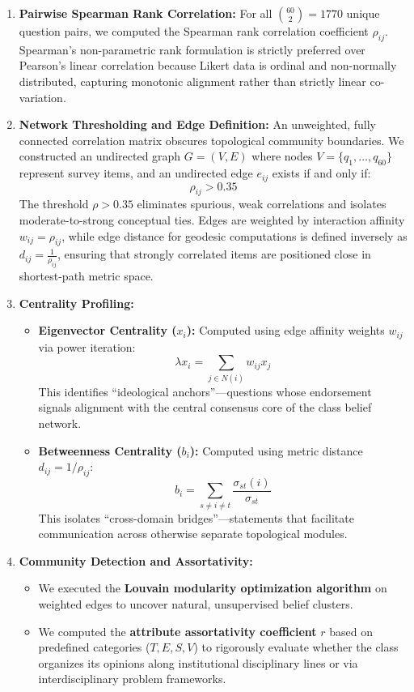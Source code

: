 \documentclass[11pt,a4paper]{article}
\begin{document}
\begin{enumerate}
    \item \textbf{Pairwise Spearman Rank Correlation:} For all $\binom{60}{2} = 1770$ unique question pairs, we computed the Spearman rank correlation coefficient $\rho_{ij}$. Spearman's non-parametric rank formulation is strictly preferred over Pearson's linear correlation because Likert data is ordinal and non-normally distributed, capturing monotonic alignment rather than strictly linear co-variation.
    
    \item \textbf{Network Thresholding and Edge Definition:} An unweighted, fully connected correlation matrix obscures topological community boundaries. We constructed an undirected graph $G = (V, E)$ where nodes $V = \{q_1, \dots, q_{60}\}$ represent survey items, and an undirected edge $e_{ij}$ exists if and only if:
    \[
    \rho_{ij} > 0.35
    \]
    The threshold $\rho > 0.35$ eliminates spurious, weak correlations and isolates moderate-to-strong conceptual ties. Edges are weighted by interaction affinity $w_{ij} = \rho_{ij}$, while edge distance for geodesic computations is defined inversely as $d_{ij} = \frac{1}{\rho_{ij}}$, ensuring that strongly correlated items are positioned close in shortest-path metric space.
    
    \item \textbf{Centrality Profiling:}
    \begin{itemize}
        \item \textbf{Eigenvector Centrality ($x_i$):} Computed using edge affinity weights $w_{ij}$ via power iteration:
        \[
        \lambda x_i = \sum_{j \in N(i)} w_{ij} x_j
        \]
        This identifies ``ideological anchors''---questions whose endorsement signals alignment with the central consensus core of the class belief network.
        \item \textbf{Betweenness Centrality ($b_i$):} Computed using metric distance $d_{ij} = 1 / \rho_{ij}$:
        \[
        b_i = \sum_{s \neq i \neq t} \frac{\sigma_{st}(i)}{\sigma_{st}}
        \]
        This isolates ``cross-domain bridges''---statements that facilitate communication across otherwise separate topological modules.
    \end{itemize}

    \item \textbf{Community Detection and Assortativity:} 
    \begin{itemize}
        \item We executed the \textbf{Louvain modularity optimization algorithm} on weighted edges to uncover natural, unsupervised belief clusters.
        \item We computed the \textbf{attribute assortativity coefficient} $r$ based on predefined categories ($T, E, S, V$) to rigorously evaluate whether the class organizes its opinions along institutional disciplinary lines or via interdisciplinary problem frameworks.
    \end{itemize}
\end{enumerate}
\end{document}
